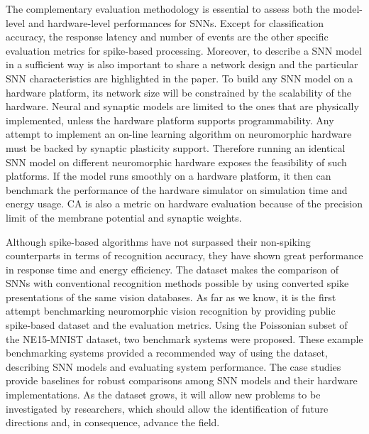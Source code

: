 \documentclass{frontiersENG} %
\begin{document}
The complementary evaluation methodology is essential to assess both the model-level and hardware-level performances for SNNs.
Except for classification accuracy, the response latency and number of events are the other specific evaluation metrics for spike-based processing.
Moreover, to describe a SNN model in a sufficient way is also important to share a network design and the particular SNN characteristics are highlighted in the paper.  
To build any SNN model on a hardware platform, its network size will be constrained by the scalability of the hardware.
Neural and synaptic models are limited to the ones that are physically implemented, unless the hardware platform supports programmability.
Any attempt to implement an on-line learning algorithm on neuromorphic hardware must be backed by synaptic plasticity support.
Therefore running an identical SNN model on different neuromorphic hardware exposes the feasibility of such platforms.
If the model runs smoothly on a hardware platform, it then can benchmark the performance of the hardware simulator on simulation time and energy usage.
CA is also a metric on hardware evaluation because of the precision limit of the membrane potential and synaptic weights.



Although spike-based algorithms have not surpassed their non-spiking counterparts in terms of recognition accuracy, they have shown great performance in response time and energy efficiency.
The dataset makes the comparison of SNNs with conventional recognition methods possible by using converted spike presentations of the same vision databases.
As far as we know, it is the first attempt benchmarking neuromorphic vision recognition by providing public spike-based dataset and the evaluation metrics.
Using the Poissonian subset of the NE15-MNIST dataset, two benchmark systems were proposed. 
These example benchmarking systems provided a recommended way of using the dataset, describing SNN models and evaluating system performance.
The case studies provide baselines for robust comparisons among SNN models and their hardware implementations.
As the dataset grows, it will allow new problems to be investigated by researchers, which should allow the identification of future directions and, in consequence, advance the field.
\end{document}
